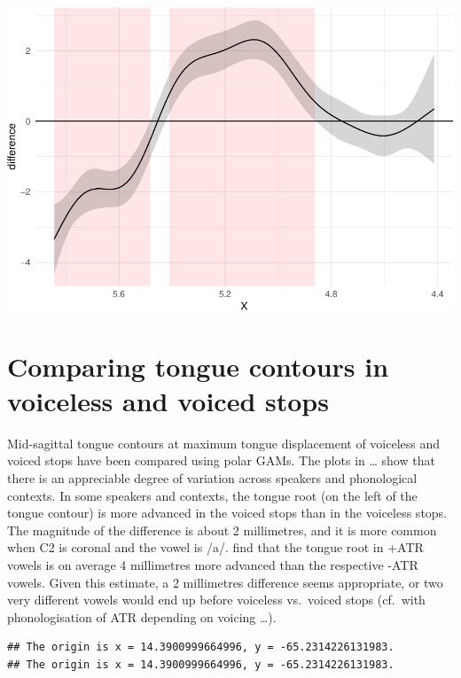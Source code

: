 \documentclass[12pt,]{article}
\begin{document}
\begin{center}\includegraphics{2018-polar-gam_files/figure-latex/diff-it01-u-1} \end{center}

\hypertarget{comparing-tongue-contours-in-voiceless-and-voiced-stops}{%
\section{Comparing tongue contours in voiceless and voiced
stops}\label{comparing-tongue-contours-in-voiceless-and-voiced-stops}}

Mid-sagittal tongue contours at maximum tongue displacement of voiceless
and voiced stops have been compared using polar GAMs. The plots in
\ldots{} show that there is an appreciable degree of variation across
speakers and phonological contexts. In some speakers and contexts, the
tongue root (on the left of the tongue contour) is more advanced in the
voiced stops than in the voiceless stops. The magnitude of the
difference is about 2 millimetres, and it is more common when C2 is
coronal and the vowel is /a/. \citet{kirkham2017} find that the tongue
root in +ATR vowels is on average 4 millimetres more advanced than the
respective -ATR vowels. Given this estimate, a 2 millimetres difference
seems appropriate, or two very different vowels would end up before
voiceless vs.~voiced stops (cf.~with phonologisation of ATR depending on
voicing \ldots{}).

\begin{verbatim}
## The origin is x = 14.3900999664996, y = -65.2314226131983.
## The origin is x = 14.3900999664996, y = -65.2314226131983.
\end{verbatim}
\end{document}
